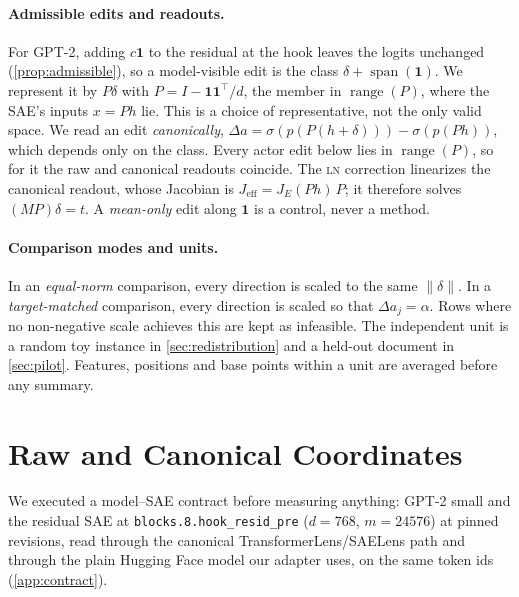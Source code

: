 \documentclass{article}
\theoremstyle{plain}
\theoremstyle{definition}
\theoremstyle{remark}
\newcommand{\LN}{\textsc{ln}}
\begin{document}
\paragraph{Admissible edits and readouts.}
For GPT-2, adding $c\mathbf{1}$ to the residual at the hook leaves the logits unchanged
(\cref{prop:admissible}), so a model-visible edit is the class $\delta+\operatorname{span}
(\mathbf{1})$. We represent it by $P\delta$ with $P = I - \mathbf{1}\mathbf{1}^{\top}/d$,
the member in $\operatorname{range}(P)$, where the SAE's inputs $x = Ph$ lie. This is a
choice of representative, not the only valid space. We read an edit \emph{canonically},
$\Delta a = \sigma(p(P(h+\delta))) - \sigma(p(Ph))$, which depends only on the class. Every
actor edit below lies in $\operatorname{range}(P)$, so for it the raw and canonical readouts
coincide. The \LN{} correction linearizes the canonical readout, whose Jacobian is
$J_{\mathrm{eff}} = J_E(Ph)\,P$; it therefore solves $(MP)\delta = t$. A \emph{mean-only}
edit along $\mathbf{1}$ is a control, never a method.

\paragraph{Comparison modes and units.}
In an \emph{equal-norm} comparison, every direction is scaled to the same $\|\delta\|$. In a
\emph{target-matched} comparison, every direction is scaled so that $\Delta a_j = \alpha$.
Rows where no non-negative scale achieves this are kept as infeasible. The independent unit
is a random toy instance in \cref{sec:redistribution} and a held-out document in \cref{sec:pilot}.
Features, positions and base points within a unit are averaged before any summary.

\section{Raw and Canonical Coordinates}
\label{sec:coord}

We executed a model--SAE contract before measuring anything: GPT-2 small and the residual
SAE at \texttt{blocks.8.hook\_resid\_pre} ($d=768$, $m=24576$) at pinned revisions, read
through the canonical TransformerLens/SAELens path and through the plain Hugging Face model
our adapter uses, on the same token ids (\cref{app:contract}).
\end{document}
